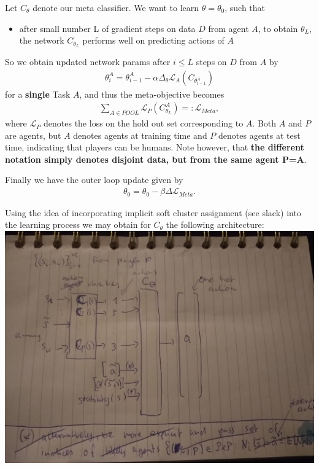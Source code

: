 \documentclass[a4paper, 11pt]{article}
\begin{document}
	
	Let $C_{\theta}$ denote our meta classifier. We want to learn $\theta=\theta_0$, such that
	\begin{itemize}
		\item after small number L of gradient steps on data $D$ from agent $A$, to obtain $\theta_L$, the network $C_{\theta_L}$ performs well on predicting actions of $A$
	\end{itemize}
	So we obtain updated network params after $i\leq L$ steps on $D$ from $A$ by
	\begin{align*}
	\theta^A_i = \theta^A_{i-1} - \alpha \Delta_{\theta} \mathcal{L}_A(C_{\theta^A_{i-1}})
	\end{align*} for a \textbf{single} Task $A$, and thus the meta-objective becomes
	\begin{align*}
	\sum_{A \in POOL} \mathcal{L}_{P}(C^A_{\theta_L}) =: \mathcal{L}_{Meta}, 
	\end{align*} where $\mathcal{L}_{P}$ denotes the loss on the hold out set corresponding to $A$. Both $A$ and $P$ are agents, but $A$ denotes agents at training time and $P$ denotes agents at test time, indicating that players can be humans. Note however, that \textbf{the different notation simply denotes disjoint data, but from the same agent P=A}.
	
	Finally we have the outer loop update given by
	\begin{align*}
	\theta_0 = \theta_0 - \beta \Delta \mathcal{L}_{Meta}.
	\end{align*}
	
	Using the idea of incorporating implicit soft cluster assignment (see slack) into the learning process we may obtain for $C_\theta$ the following architecture:\\
	
	\includegraphics[scale=.5]{architecture}
	
\end{document}
